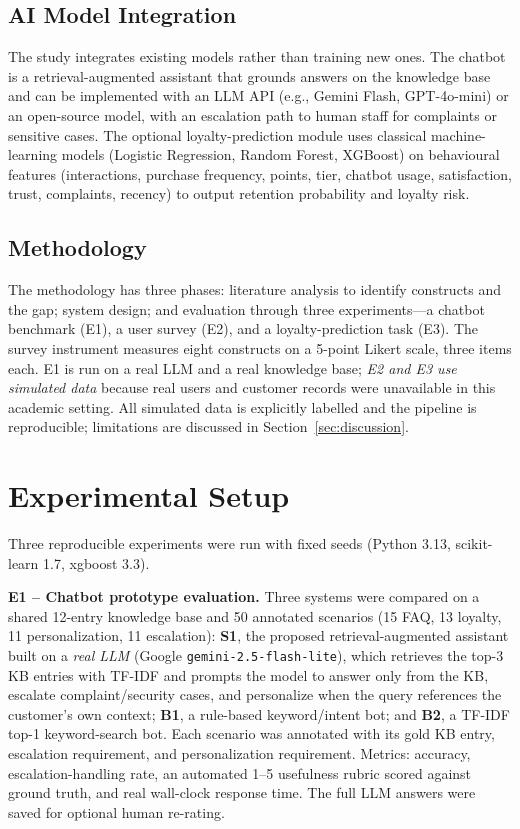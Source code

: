 \documentclass[runningheads]{llncs}
\begin{document}
\subsection{AI Model Integration}
The study integrates existing models rather than training new ones. The chatbot is a retrieval-augmented assistant that grounds answers on the knowledge base and can be implemented with an LLM API (e.g., Gemini Flash, GPT-4o-mini) or an open-source model, with an escalation path to human staff for complaints or sensitive cases. The optional loyalty-prediction module uses classical machine-learning models (Logistic Regression, Random Forest, XGBoost) on behavioural features (interactions, purchase frequency, points, tier, chatbot usage, satisfaction, trust, complaints, recency) to output retention probability and loyalty risk.

\subsection{Methodology}
The methodology has three phases: literature analysis to identify constructs and the gap; system design; and evaluation through three experiments---a chatbot benchmark (E1), a user survey (E2), and a loyalty-prediction task (E3). The survey instrument measures eight constructs on a 5-point Likert scale, three items each. E1 is run on a real LLM and a real knowledge base; \emph{E2 and E3 use simulated data} because real users and customer records were unavailable in this academic setting. All simulated data is explicitly labelled and the pipeline is reproducible; limitations are discussed in Section~\ref{sec:discussion}.

\section{Experimental Setup}

Three reproducible experiments were run with fixed seeds (Python 3.13, scikit-learn 1.7, xgboost 3.3).

\noindent\textbf{E1 -- Chatbot prototype evaluation.} Three systems were compared on a shared 12-entry knowledge base and 50 annotated scenarios (15 FAQ, 13 loyalty, 11 personalization, 11 escalation): \textbf{S1}, the proposed retrieval-augmented assistant built on a \emph{real LLM} (Google \texttt{gemini-2.5-flash-lite}), which retrieves the top-3 KB entries with TF-IDF and prompts the model to answer only from the KB, escalate complaint/security cases, and personalize when the query references the customer's own context; \textbf{B1}, a rule-based keyword/intent bot; and \textbf{B2}, a TF-IDF top-1 keyword-search bot. Each scenario was annotated with its gold KB entry, escalation requirement, and personalization requirement. Metrics: accuracy, escalation-handling rate, an automated 1--5 usefulness rubric scored against ground truth, and real wall-clock response time. The full LLM answers were saved for optional human re-rating.
\end{document}
